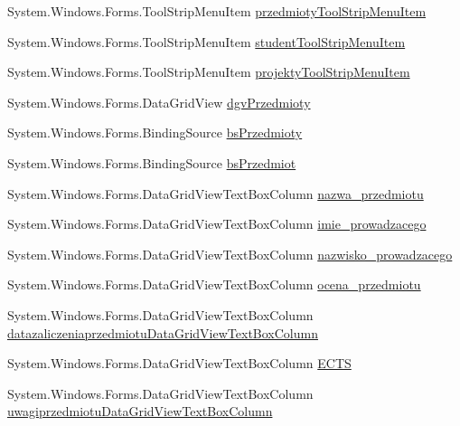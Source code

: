 \begin{DoxyCompactItemize}
\item 
System.\+Windows.\+Forms.\+Tool\+Strip\+Menu\+Item \hyperlink{class_dziennik_ocen_1_1_form_student_ab9ae6e2b2b722f8d4b90c1988b68f04a}{przedmioty\+Tool\+Strip\+Menu\+Item}
\item 
System.\+Windows.\+Forms.\+Tool\+Strip\+Menu\+Item \hyperlink{class_dziennik_ocen_1_1_form_student_a81c962610d454907184a68ead246043a}{student\+Tool\+Strip\+Menu\+Item}
\item 
System.\+Windows.\+Forms.\+Tool\+Strip\+Menu\+Item \hyperlink{class_dziennik_ocen_1_1_form_student_abe4d99d118caf2dd3a83520c7c8959a5}{projekty\+Tool\+Strip\+Menu\+Item}
\item 
System.\+Windows.\+Forms.\+Data\+Grid\+View \hyperlink{class_dziennik_ocen_1_1_form_student_add708c323708298fe045443191d3e460}{dgv\+Przedmioty}
\item 
System.\+Windows.\+Forms.\+Binding\+Source \hyperlink{class_dziennik_ocen_1_1_form_student_ab7aa9f85423ddc31529463cd1090aea4}{bs\+Przedmioty}
\item 
System.\+Windows.\+Forms.\+Binding\+Source \hyperlink{class_dziennik_ocen_1_1_form_student_a11ca8056f8886a9901f8b2faf61752ac}{bs\+Przedmiot}
\item 
System.\+Windows.\+Forms.\+Data\+Grid\+View\+Text\+Box\+Column \hyperlink{class_dziennik_ocen_1_1_form_student_a9809e038a5e376197dd5fbb861fd0740}{nazwa\+\_\+przedmiotu}
\item 
System.\+Windows.\+Forms.\+Data\+Grid\+View\+Text\+Box\+Column \hyperlink{class_dziennik_ocen_1_1_form_student_a60bcd7a58082934557af5075cbd7ccfa}{imie\+\_\+prowadzacego}
\item 
System.\+Windows.\+Forms.\+Data\+Grid\+View\+Text\+Box\+Column \hyperlink{class_dziennik_ocen_1_1_form_student_a8e07d405ca0f4b4f5f7523532412c542}{nazwisko\+\_\+prowadzacego}
\item 
System.\+Windows.\+Forms.\+Data\+Grid\+View\+Text\+Box\+Column \hyperlink{class_dziennik_ocen_1_1_form_student_a59ad819ffe8a8bc989fbe2ffd30d00ce}{ocena\+\_\+przedmiotu}
\item 
System.\+Windows.\+Forms.\+Data\+Grid\+View\+Text\+Box\+Column \hyperlink{class_dziennik_ocen_1_1_form_student_acfb521b7766430c6b5cbe1caa2fa1a14}{datazaliczeniaprzedmiotu\+Data\+Grid\+View\+Text\+Box\+Column}
\item 
System.\+Windows.\+Forms.\+Data\+Grid\+View\+Text\+Box\+Column \hyperlink{class_dziennik_ocen_1_1_form_student_a74dad6dadfd0510d449ca61b08ca26dc}{E\+C\+TS}
\item 
System.\+Windows.\+Forms.\+Data\+Grid\+View\+Text\+Box\+Column \hyperlink{class_dziennik_ocen_1_1_form_student_a920b3854d830dc870dba5765710fc28d}{uwagiprzedmiotu\+Data\+Grid\+View\+Text\+Box\+Column}

\end{DoxyCompactItemize}

